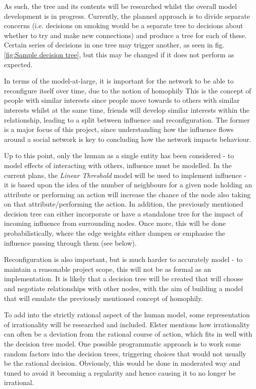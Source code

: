 \documentclass[]{article}
\begin{document}
As such, the tree and its contents will be researched whilst the overall model development is in progress. Currently, the planned approach is to divide separate concerns (i.e. decisions on smoking would be a separate tree to decisions about whether to try and make new connections) and produce a tree for each of these. Certain series of decisions in one tree may trigger another, as seen in fig. \ref{fig:Sample decision tree}, but this may be changed if it does not perform as expected.

In terms of the model-at-large, it is important for the network to be able to reconfigure itself over time, due to the notion of homophily \cite{USN} This is the concept of people with similar interests since people move towards to others with similar interests whilst at the same time, friends will develop similar interests within the relationship, leading to a split between influence and reconfiguration. The former is a major focus of this project, since understanding how the influence flows around a social network is key to concluding how the network impacts behaviour. 

Up to this point, only the human as a single entity has been considered - to model effects of interacting with others, influence must be modelled. In the current plans, the \emph{Linear Threshold} model will be used to implement influence - it is based upon the idea of the number of neighbours for a given node holding an attribute or performing an action will increase the chance of the node also taking on that attribute/performing the action. In addition, the previously mentioned decision tree can either incorporate or have a standalone tree for the impact of incoming influence from surrounding nodes. Once more, this will be done probabilistically, where the edge weights either dampen or emphasise the influence passing through them (see below). 

Reconfiguration is also important, but is much harder to accurately model - to maintain a reasonable project scope, this will not be as formal as an implementation. It is likely that a decision tree will be created that will choose and negotiate relationships with other nodes, with the aim of building a model that will emulate the previously mentioned concept of homophily.

To add into the strictly rational aspect of the human model, some representation of irrationality will be researched and included. Elster \cite{ESB} mentions how irrationality can often be a deviation from the rational course of action, which fits in well with the decision tree model. One possible programmatic approach is to work some random factors into the decision trees, triggering choices that would not usually be the rational decision. Obviously, this would be done in moderated way and tuned to avoid it becoming a regularity and hence causing it to no longer be irrational.
\end{document}
